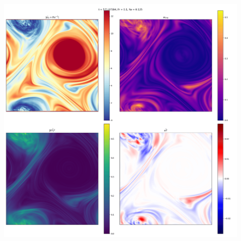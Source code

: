 \documentclass[30pt, blockverticalspace=1cm]{tikzposter}
\begin{document}
\begin{columns}
{\begin{center}
    \emp
        \centering
        \includegraphics[width=\linewidth]{images/Om8B100Re600Pe60_vert_avg.pdf}
    \emp


    \end{center}

    \begin{gather*}

    \end{gather*}
}



\end{columns}
\end{document}
